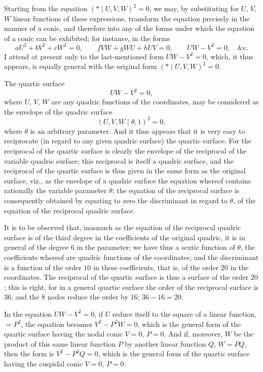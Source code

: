 \documentclass[11pt,a4paper]{article}
\providecommand{\midbar}{\mid}
\begin{document}
Starting from the equation $(*\!\midbar\! U, V, W)^{2} = 0$, we may, by
substituting for $U$, $V$, $W$ linear functions of these expressions,
transform the equation precisely in the manner of a conic, and therefore
into any of the forms under which the equation of a conic can be
exhibited; for instance, in the forms
\[
a U^{2} + b V^{2} + c W^{2} = 0, \qquad
f V W + g W U + h U V = 0, \qquad
U W - V^{2} = 0,\quad \text{\&c.}
\]
I attend at present only to the last-mentioned form $U W - V^{2} = 0$,
which, it thus appears, is equally general with the original form
$(*\!\midbar\! U, V, W)^{2} = 0$.

The quartic surface
\[
U W - V^{2} = 0,
\]
where $U$, $V$, $W$ are any quadric functions of the coordinates, may be
considered as the envelope of the quadric surface
\[
(U, V, W\!\midbar\! \theta, 1)^{2} = 0,
\]
where $\theta$ is an arbitrary parameter. And it thus appears that it is
very easy to reciprocate (in regard to any given quadric surface) the
quartic surface. For the reciprocal of the quartic surface is clearly the
envelope of the reciprocal of the variable quadric surface; this reciprocal
is itself a quadric surface, and the reciprocal of the quartic surface is
thus given in the same form as the original surface, viz., as the envelope
of a quadric surface the equation whereof contains rationally the variable
parameter $\theta$; the equation of the reciprocal surface is consequently
obtained by equating to zero the discriminant in regard to $\theta$, of the
equation of the reciprocal quadric surface.

It is to be observed that, inasmuch as the equation of the reciprocal
quadric surface is of the third degree in the coefficients of the original
quadric, it is in general of the degree $6$ in the parameter; we have thus
a sextic function of $\theta$, the coefficients whereof are quadric
functions of the coordinates; and the discriminant is a function of the
order $10$ in these coefficients, that is, of the order $20$ in the
coordinates. The reciprocal of the quartic surface is thus a surface of
the order $20$; this is right, for in a general quartic surface the order
of the reciprocal surface is $36$, and the $8$ nodes reduce the order by
$16$; $36 - 16 = 20$.

In the equation $U W - V^{2} = 0$, if $U$ reduce itself to the square of
a linear function, $= P^{2}$, the equation becomes $V^{2} - P^{2} W = 0$,
which is the general form of the quartic surface having the nodal conic
$V = 0$, $P = 0$. And if, moreover, $W$ be the product of this same linear
function $P$ by another linear function $Q$, $W = P Q$, then the form is
$V^{2} - P^{3} Q = 0$, which is the general form of the quartic surface
having the cuspidal conic $V = 0$, $P = 0$.
\end{document}
